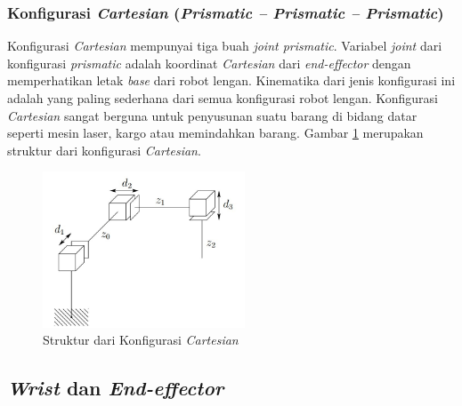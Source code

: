 \subsubsection{Konfigurasi \textit{Cartesian} (\textit{Prismatic – Prismatic – Prismatic})  } 

Konfigurasi \textit{Cartesian} mempunyai tiga buah \textit{joint prismatic}. Variabel \textit{joint} dari konfigurasi \textit{prismatic} adalah koordinat \textit{Cartesian} dari \textit{end-effector} dengan memperhatikan letak \textit{base} dari robot lengan. Kinematika dari jenis konfigurasi ini adalah yang paling sederhana dari semua konfigurasi robot lengan. Konfigurasi \textit{Cartesian} sangat berguna untuk penyusunan suatu barang di bidang datar seperti mesin laser, kargo atau memindahkan barang. Gambar \ref{pic.cartesian} merupakan struktur dari konfigurasi \textit{Cartesian}.

	\begin{figure}[H]
	\centering
	\includegraphics[width=6cm]{gambar/cartesian.jpg}
	\caption{Struktur dari Konfigurasi \textit{Cartesian}\cite{Spong2006}}
	\label{pic.cartesian}
\end{figure}

\subsection{ \textit{Wrist} dan \textit{End-effector} }

